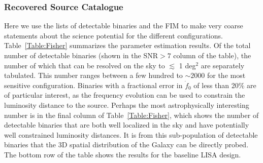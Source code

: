 \documentclass{iopart}
\begin{document}
\subsubsection{Recovered Source Catalogue}
Here we use the lists of detectable binaries and the FIM to make very coarse statements about the science potential for the 
different configurations.  Table~\ref{Table:Fisher} summarizes the parameter estimation results.  Of the total number of 
detectable binaries (shown in the SNR$>7$ column of the table), the number of which that can be resolved on the sky to 
$\lesssim$ 1 deg$^2$ are separately tabulated.  This number ranges between a few hundred to $\sim 2000$ for the most sensitive configuration.  Binaries with a fractional error in $\dot{f}_0$ of less than 20\% are of particular interest, as the 
frequency evolution can be used to constrain the luminosity distance to the source.  Perhaps the most astrophysically 
interesting number is in the final column of Table~\ref{Table:Fisher}, which shows the number of detectable binaries that are 
both well localized in the sky and have potentially well constrained luminosity distances.  It is from this sub-population of 
detectable binaries that the 3D spatial distribution of the Galaxy can be directly probed.  The bottom row of the table shows 
the results for the baseline LISA design.
\end{document}
